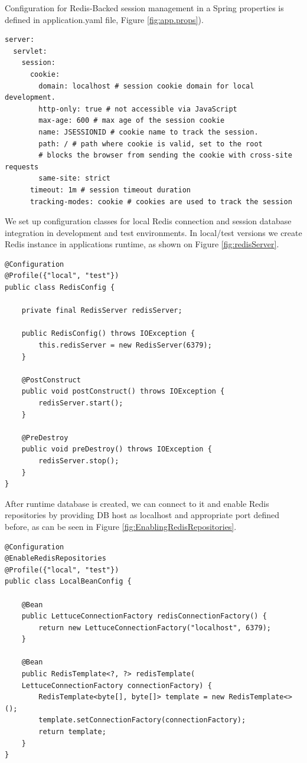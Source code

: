 Configuration for Redis-Backed session management in a Spring properties is defined in application.yaml file, Figure \ref{fig:app.props}).

\renewcommand\theFancyVerbLine{\large\arabic{FancyVerbLine}}
{
\begin{verbatim}
server:
  servlet:
    session:
      cookie:
        domain: localhost # session cookie domain for local development.
        http-only: true # not accessible via JavaScript
        max-age: 600 # max age of the session cookie
        name: JSESSIONID # cookie name to track the session.
        path: / # path where cookie is valid, set to the root
        # blocks the browser from sending the cookie with cross-site requests
        same-site: strict 
      timeout: 1m # session timeout duration
      tracking-modes: cookie # cookies are used to track the session
\end{verbatim}
\label{fig:app.props}
}

We set up configuration classes for local Redis connection and session database integration in development and test environments. In local/test versions we create Redis instance in applications runtime, as shown on Figure \ref{fig:redisServer}.

{
\begin{verbatim}
@Configuration
@Profile({"local", "test"})
public class RedisConfig {

    private final RedisServer redisServer;

    public RedisConfig() throws IOException {
        this.redisServer = new RedisServer(6379);
    }

    @PostConstruct
    public void postConstruct() throws IOException {
        redisServer.start();
    }

    @PreDestroy
    public void preDestroy() throws IOException {
        redisServer.stop();
    }
}
\end{verbatim}
\label{fig:redisServer}
}



After runtime database is created, we can connect to it and enable Redis repositories by providing DB host as localhost and appropriate port defined before, as can be seen in Figure \ref{fig:EnablingRedisRepositories}. 
{
\begin{verbatim}
@Configuration
@EnableRedisRepositories
@Profile({"local", "test"})
public class LocalBeanConfig {

    @Bean
    public LettuceConnectionFactory redisConnectionFactory() {
        return new LettuceConnectionFactory("localhost", 6379);
    }

    @Bean
    public RedisTemplate<?, ?> redisTemplate(
    LettuceConnectionFactory connectionFactory) {
        RedisTemplate<byte[], byte[]> template = new RedisTemplate<>();
        template.setConnectionFactory(connectionFactory);
        return template;
    }
}
\end{verbatim}
\label{fig:EnablingRedisRepositories}
}
